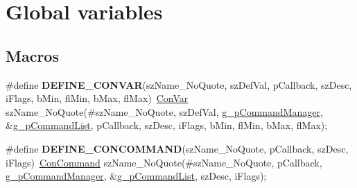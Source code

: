 \hypertarget{group___global_variables}{\section{Global variables}
\label{group___global_variables}
}
\subsection*{Macros}
\begin{DoxyCompactItemize}
\item 
\hypertarget{group___global_variables_gaf9c6d8de2e7b3d11f070bb500d62edce}{\#define {\bfseries D\-E\-F\-I\-N\-E\-\_\-\-C\-O\-N\-V\-A\-R}(sz\-Name\-\_\-\-No\-Quote, sz\-Def\-Val, p\-Callback, sz\-Desc, i\-Flags, b\-Min, fl\-Min, b\-Max, fl\-Max)~\hyperlink{class_con_var}{Con\-Var} sz\-Name\-\_\-\-No\-Quote(\#sz\-Name\-\_\-\-No\-Quote, sz\-Def\-Val, \hyperlink{group___global_variables_ga4d39defaa5d22f29bde4c75d590bd0fe}{g\-\_\-p\-Command\-Manager}, \&\hyperlink{group___global_variables_ga8389c826239a1bc627ae3b7f97a79fe4}{g\-\_\-p\-Command\-List}, p\-Callback, sz\-Desc, i\-Flags, b\-Min, fl\-Min, b\-Max, fl\-Max);}\label{group___global_variables_gaf9c6d8de2e7b3d11f070bb500d62edce}

\item 
\hypertarget{group___global_variables_ga5c65583f94cc62a481b1846c0e6e3344}{\#define {\bfseries D\-E\-F\-I\-N\-E\-\_\-\-C\-O\-N\-C\-O\-M\-M\-A\-N\-D}(sz\-Name\-\_\-\-No\-Quote, p\-Callback, sz\-Desc, i\-Flags)~\hyperlink{class_con_command}{Con\-Command} sz\-Name\-\_\-\-No\-Quote(\#sz\-Name\-\_\-\-No\-Quote, p\-Callback, \hyperlink{group___global_variables_ga4d39defaa5d22f29bde4c75d590bd0fe}{g\-\_\-p\-Command\-Manager}, \&\hyperlink{group___global_variables_ga8389c826239a1bc627ae3b7f97a79fe4}{g\-\_\-p\-Command\-List}, sz\-Desc, i\-Flags);}\label{group___global_variables_ga5c65583f94cc62a481b1846c0e6e3344}

\end{DoxyCompactItemize}
